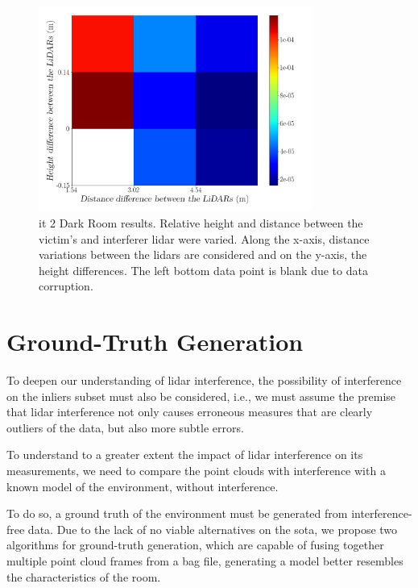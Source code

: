\begin{figure}[!ht]
	\centering
	\includegraphics[width=0.8\textwidth]{img/lidar-interference/box-filtering/interference-box-filter-outliers-it2.png}
	\caption{\ac{it} 2 Dark Room results. Relative height and distance between the victim's and interferer \ac{lidar} were varied. Along the x-axis, distance variations between the \acp{lidar} are considered and on the y-axis, the height differences. The left bottom data point is blank due to data corruption.}
	\label{fig:box-filter-outliers-it2}
\end{figure}


\section{Ground-Truth Generation}
\label{sec:lidar-interference:ground-truth}
To deepen our understanding of \ac{lidar} interference, the possibility of interference on the inliers subset must also be considered, i.e., we must assume the premise that \ac{lidar} interference not only causes erroneous measures that are clearly outliers of the data, but also more subtle errors.

To understand to a greater extent the impact of \ac{lidar} interference on its measurements, we need to compare the point clouds with interference with a known model of the environment, without interference. 

To do so, a ground truth of the environment must be generated from interference-free data. Due to the lack of no viable alternatives on the \acl{sota}, we propose two algorithms for ground-truth generation, which are capable of fusing together multiple point cloud frames from a bag file, generating a model better resembles the characteristics of the room.

